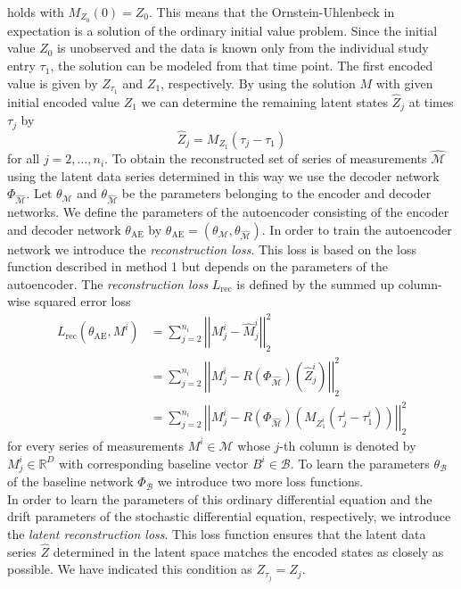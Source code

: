 \documentclass[11pt,titlepage]{article}
\newcommand{\R}{\mathbb{R}} %
\newcommand{\abs}[1]{{\left| #1 \right|}}
\theoremstyle{definition}
\theoremstyle{remark}
\begin{document}
	holds with $M_{Z_0}(0) = Z_0$. This means that the Ornstein-Uhlenbeck in expectation is a solution of the ordinary initial value problem. Since the initial value $Z_0$ is unobserved and the data is known only from the individual study entry $\tau_1$, the solution can be modeled from that time point. The first encoded value is given by $Z_{\tau_1}$ and $Z_1$, respectively. By using the solution $M$ with given initial encoded value $Z_1$ we can determine the remaining latent states $\hat{Z}_j$ at times $\tau_j$ by
	\[\hat{Z}_j = M_{Z_1}(\tau_j - \tau_1)\]
	for all $j=2,\ldots,n_i$. To obtain the reconstructed set of series of measurements $\hat{\mathcal{M}}$ using the latent data series determined in this way we use the decoder network $\Phi_{\hat{\mathcal{M}}}$. Let $\theta_\mathcal{M}$ and $\theta_{\hat{\mathcal{M}}}$ be the parameters belonging to the encoder and decoder networks. We define the parameters of the autoencoder consisting of the encoder and decoder network $\theta_\mathrm{AE}$ by $\theta_\mathrm{AE}= (\theta_\mathcal{M},\theta_{\hat{\mathcal{M}}})$. In order to train the autoencoder network we introduce the \textsl{reconstruction loss}. This loss is based on the loss function described in method 1 but depends on the parameters of the autoencoder. The \textsl{reconstruction loss} $L_\mathrm{rec}$ is defined by the summed up column-wise squared error loss
	\begin{align*}
		L_{\mathrm{rec}}(\theta_\mathrm{AE}, M^i) &= \sum_{j=2}^{n_i} \abs{\abs{M^i_j- \hat{M}^i_j}}_2^2\\
		&= \sum_{j=2}^{n_i} \abs{\abs{M^i_j- R(\Phi_{\hat{\mathcal{M}}})(\hat{Z}^i_j)}}_2^2\\
		&= \sum_{j=2}^{n_i} \abs{\abs{M^i_j- R(\Phi_{\hat{\mathcal{M}}})(M_{Z^i_1}(\tau^i_j -\tau^i_1))}}_2^2
	\end{align*}
	for every series of measurements $M^i\in \mathcal{M}$ whose $j$-th column is denoted by $M^i_j\in\R^D$ with corresponding baseline vector $B^i\in\mathcal{B}$. To learn the parameters $\theta_\mathcal{B}$ of the baseline network $\Phi_\mathcal{B}$ we introduce two more loss functions. \\
	In order to learn the parameters of this ordinary differential equation and the drift parameters of the stochastic differential equation, respectively, we introduce the \textsl{latent reconstruction loss}. This loss function ensures that the latent data series $\hat{Z}$ determined in the latent space matches the encoded states as closely as possible. We have indicated this condition as $Z_{\tau_j}=Z_j$. 
\end{document}
